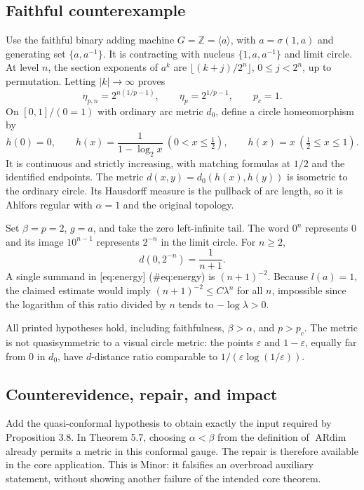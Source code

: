 \documentclass[10pt]{article}
\begin{document}
\subsection*{Faithful counterexample}
Use the faithful binary adding machine \(G=\mathbb Z=\langle a\rangle\), with \(a=\sigma(1,a)\) and generating set \(\{a,a^{-1}\}\). It is contracting with nucleus \(\{1,a,a^{-1}\}\) and limit circle. At level \(n\), the section exponents of \(a^k\) are \(\lfloor(k+j)/2^n\rfloor\), \(0\le j<2^n\), up to permutation. Letting \(|k|\to\infty\) proves \[\eta_{p,n}=2^{n(1/p-1)},\qquad \eta_p=2^{1/p-1},\qquad p_c=1.\] On \([0,1]/(0=1)\) with ordinary arc metric \(d_0\), define a circle homeomorphism by \[h(0)=0,\qquad h(x)=\frac1{1-\log_2x}\ (0<x\le\tfrac12),
 \qquad h(x)=x\ (\tfrac12\le x\le1).\] It is continuous and strictly increasing, with matching formulas at \(1/2\) and the identified endpoints. The metric \(d(x,y)=d_0(h(x),h(y))\) is isometric to the ordinary circle. Its Hausdorff measure is the pullback of arc length, so it is Ahlfors regular with \(\alpha=1\) and the original topology.\par
Set \(\beta=p=2\), \(g=a\), and take the zero left-infinite tail. The word \(0^n\) represents \(0\) and its image \(10^{n-1}\) represents \(2^{-n}\) in the limit circle. For \(n\ge2\), \[d(0,2^{-n})=\frac1{n+1}.\] A single summand in [eq:energy] (\#eq:energy) is \((n+1)^{-2}\). Because \(l(a)=1\), the claimed estimate would imply \((n+1)^{-2}\le C\lambda^n\) for all \(n\), impossible since the logarithm of this ratio divided by \(n\) tends to \(-\log\lambda>0\).\par
All printed hypotheses hold, including faithfulness, \(\beta>\alpha\), and \(p>p_c\). The metric is not quasisymmetric to a visual circle metric: the points \(\varepsilon\) and \(1-\varepsilon\), equally far from \(0\) in \(d_0\), have \(d\)-distance ratio comparable to \(1/(\varepsilon\log(1/\varepsilon))\).\par
\subsection*{Counterevidence, repair, and impact}
Add the quasi-conformal hypothesis to obtain exactly the input required by Proposition 3.8. In Theorem 5.7, choosing \(\alpha<\beta\) from the definition of \(\operatorname{ARdim}\) already permits a metric in this conformal gauge. The repair is therefore available in the core application. This is Minor: it falsifies an overbroad auxiliary statement, without showing another failure of the intended core theorem.\par
\end{document}
